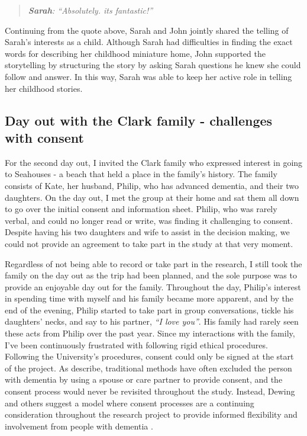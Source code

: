 \begin{quote}
\textit{    \textbf{Sarah}: ``Absolutely. its fantastic!''
}
\end{quote}

Continuing from the quote above, Sarah and John jointly shared the telling of Sarah's interests as a child. Although Sarah had difficulties in finding the exact words for describing her childhood miniature home, John supported the storytelling by structuring the story by asking Sarah questions he knew she could follow and answer. In this way, Sarah was able to keep her active role in telling her childhood stories.


\subsection{Day out with the Clark family - challenges with consent}
\label{ClarkFamily}
For the second day out, I invited the Clark family who expressed interest in going to Seahouses - a beach that held a place in the family's history. The family consists of Kate, her husband, Philip, who has advanced dementia, and their two daughters. On the day out, I met the group at their home and sat them all down to go over the initial consent and information sheet. Philip, who was rarely verbal, and could no longer read or write, was finding it challenging to consent. Despite having his two daughters and wife to assist in the decision making, we could not provide an agreement to take part in the study at that very moment. 

Regardless of not being able to record or take part in the research, I still took the family on the day out as the trip had been planned, and the sole purpose was to provide an enjoyable day out for the family. Throughout the day, Philip's interest in spending time with myself and his family became more apparent, and by the end of the evening, Philip started to take part in group conversations, tickle his daughters' necks, and say to his partner, \textit{``I love you''}. His family had rarely seen these acts from Philip over the past year. Since my interactions with the family, I've been continuously frustrated with following rigid ethical procedures. Following the University's procedures, consent could only be signed at the start of the project. As \cite{dewing_participatory_2007} describe, traditional methods have often excluded the person with dementia by using a spouse or care partner to provide consent, and the consent process would never be revisited throughout the study. Instead, Dewing and others suggest a model where consent processes are a continuing consideration throughout the research project to provide informed flexibility and involvement from people with dementia \citep{dewing_participatory_2007,slaughter2007consent,mckeown_actively_2009}.

